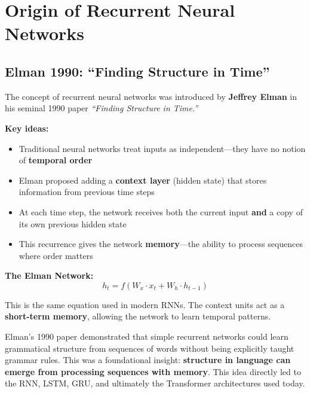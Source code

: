 \documentclass[11pt,a4paper]{article}
\begin{document}
\section{Origin of Recurrent Neural Networks}

\subsection{Elman 1990: ``Finding Structure in Time''}

The concept of recurrent neural networks was introduced by \textbf{Jeffrey Elman} in his seminal 1990 paper \textit{``Finding Structure in Time.''}

\textbf{Key ideas:}
\begin{itemize}[leftmargin=1.5em]
    \item Traditional neural networks treat inputs as independent---they have no notion of \textbf{temporal order}
    \item Elman proposed adding a \textbf{context layer} (hidden state) that stores information from previous time steps
    \item At each time step, the network receives both the current input \textbf{and} a copy of its own previous hidden state
    \item This recurrence gives the network \textbf{memory}---the ability to process sequences where order matters
\end{itemize}

\textbf{The Elman Network:}
\begin{equation}
h_t = f(W_x \cdot x_t + W_h \cdot h_{t-1})
\end{equation}

This is the same equation used in modern RNNs. The context units act as a \textbf{short-term memory}, allowing the network to learn temporal patterns.

\begin{tcolorbox}[warnbox={Historical Significance}]
Elman's 1990 paper demonstrated that simple recurrent networks could learn grammatical structure from sequences of words without being explicitly taught grammar rules. This was a foundational insight: \textbf{structure in language can emerge from processing sequences with memory}. This idea directly led to the RNN, LSTM, GRU, and ultimately the Transformer architectures used today.
\end{tcolorbox}
\end{document}
